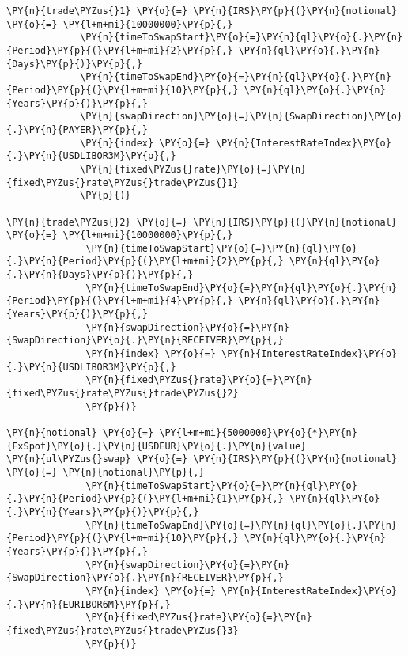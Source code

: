     \begin{tcolorbox}[breakable, size=fbox, boxrule=1pt, pad at break*=1mm,colback=cellbackground, colframe=cellborder]
\begin{Verbatim}[commandchars=\\\{\}]
\PY{n}{trade\PYZus{}1} \PY{o}{=} \PY{n}{IRS}\PY{p}{(}\PY{n}{notional} \PY{o}{=} \PY{l+m+mi}{10000000}\PY{p}{,}
             \PY{n}{timeToSwapStart}\PY{o}{=}\PY{n}{ql}\PY{o}{.}\PY{n}{Period}\PY{p}{(}\PY{l+m+mi}{2}\PY{p}{,} \PY{n}{ql}\PY{o}{.}\PY{n}{Days}\PY{p}{)}\PY{p}{,}
             \PY{n}{timeToSwapEnd}\PY{o}{=}\PY{n}{ql}\PY{o}{.}\PY{n}{Period}\PY{p}{(}\PY{l+m+mi}{10}\PY{p}{,} \PY{n}{ql}\PY{o}{.}\PY{n}{Years}\PY{p}{)}\PY{p}{,}
             \PY{n}{swapDirection}\PY{o}{=}\PY{n}{SwapDirection}\PY{o}{.}\PY{n}{PAYER}\PY{p}{,}
             \PY{n}{index} \PY{o}{=} \PY{n}{InterestRateIndex}\PY{o}{.}\PY{n}{USDLIBOR3M}\PY{p}{,}
             \PY{n}{fixed\PYZus{}rate}\PY{o}{=}\PY{n}{fixed\PYZus{}rate\PYZus{}trade\PYZus{}1}
             \PY{p}{)}

\PY{n}{trade\PYZus{}2} \PY{o}{=} \PY{n}{IRS}\PY{p}{(}\PY{n}{notional} \PY{o}{=} \PY{l+m+mi}{10000000}\PY{p}{,}
              \PY{n}{timeToSwapStart}\PY{o}{=}\PY{n}{ql}\PY{o}{.}\PY{n}{Period}\PY{p}{(}\PY{l+m+mi}{2}\PY{p}{,} \PY{n}{ql}\PY{o}{.}\PY{n}{Days}\PY{p}{)}\PY{p}{,}
              \PY{n}{timeToSwapEnd}\PY{o}{=}\PY{n}{ql}\PY{o}{.}\PY{n}{Period}\PY{p}{(}\PY{l+m+mi}{4}\PY{p}{,} \PY{n}{ql}\PY{o}{.}\PY{n}{Years}\PY{p}{)}\PY{p}{,}
              \PY{n}{swapDirection}\PY{o}{=}\PY{n}{SwapDirection}\PY{o}{.}\PY{n}{RECEIVER}\PY{p}{,}
              \PY{n}{index} \PY{o}{=} \PY{n}{InterestRateIndex}\PY{o}{.}\PY{n}{USDLIBOR3M}\PY{p}{,}
              \PY{n}{fixed\PYZus{}rate}\PY{o}{=}\PY{n}{fixed\PYZus{}rate\PYZus{}trade\PYZus{}2}
              \PY{p}{)}

\PY{n}{notional} \PY{o}{=} \PY{l+m+mi}{5000000}\PY{o}{*}\PY{n}{FxSpot}\PY{o}{.}\PY{n}{USDEUR}\PY{o}{.}\PY{n}{value}
\PY{n}{ul\PYZus{}swap} \PY{o}{=} \PY{n}{IRS}\PY{p}{(}\PY{n}{notional} \PY{o}{=} \PY{n}{notional}\PY{p}{,}
              \PY{n}{timeToSwapStart}\PY{o}{=}\PY{n}{ql}\PY{o}{.}\PY{n}{Period}\PY{p}{(}\PY{l+m+mi}{1}\PY{p}{,} \PY{n}{ql}\PY{o}{.}\PY{n}{Years}\PY{p}{)}\PY{p}{,}
              \PY{n}{timeToSwapEnd}\PY{o}{=}\PY{n}{ql}\PY{o}{.}\PY{n}{Period}\PY{p}{(}\PY{l+m+mi}{10}\PY{p}{,} \PY{n}{ql}\PY{o}{.}\PY{n}{Years}\PY{p}{)}\PY{p}{,}
              \PY{n}{swapDirection}\PY{o}{=}\PY{n}{SwapDirection}\PY{o}{.}\PY{n}{RECEIVER}\PY{p}{,}
              \PY{n}{index} \PY{o}{=} \PY{n}{InterestRateIndex}\PY{o}{.}\PY{n}{EURIBOR6M}\PY{p}{,}
              \PY{n}{fixed\PYZus{}rate}\PY{o}{=}\PY{n}{fixed\PYZus{}rate\PYZus{}trade\PYZus{}3}
              \PY{p}{)}


\end{Verbatim}
\end{tcolorbox}

